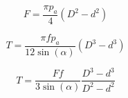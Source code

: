 \documentclass[12pt, letterpaper]{extarticle}
\begin{document}

\begin{equation*}
    F = \frac{\pi p_{a}}{4}(D^{2} - d^{2})
\end{equation*}

\begin{equation*}
    T = \frac{\pi fp_{a}}{12\sin(\alpha)}(D^{3} - d^{3})
\end{equation*}

\begin{equation*}
    T = \frac{Ff}{3\sin(\alpha)} \frac{D^3 - d^3}{D^2 - d^2}
\end{equation*}
\end{document}

